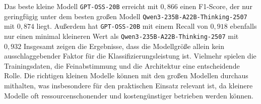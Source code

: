  Das beste kleine Modell \texttt{GPT-OSS-20B} erreicht mit $0{,}866$ einen F1-Score, der nur geringfügig unter dem besten großen Modell \texttt{Qwen3-235B-A22B-Thinking-2507} mit $0{,}874$ liegt. Außerdem hat \texttt{GPT-OSS-20B} mit einem Recall von $0{,}918$ ebenfalls nur einen minimal kleineren Wert als \texttt{Qwen3-235B-A22B-Thinking-2507} mit $0{,}932$ Insgesamt zeigen die Ergebnisse, dass die Modellgröße allein kein ausschlaggebender Faktor für die Klassifizierungsleistung ist. Vielmehr spielen die Trainingsdaten, die Feinabstimmung und die Architektur eine entscheidende Rolle. Die richtigen kleinen Modelle können mit den großen Modellen durchaus mithalten, was insbesondere für den praktischen Einsatz relevant ist, da kleinere Modelle oft ressourcenschonender und kostengünstiger betrieben werden können.